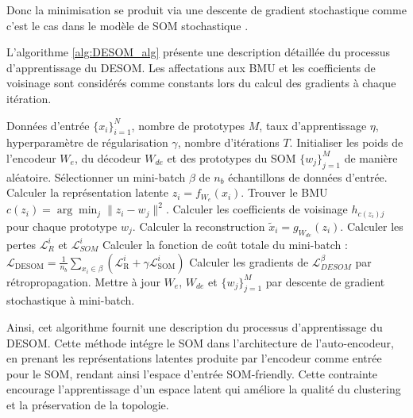 \documentclass[12pt,a4paper]{report}
\begin{document}
Donc la minimisation se produit via une descente de gradient stochastique comme c'est le cas dans le modèle de SOM stochastique \cite{DESOM}.

L'algorithme \ref{alg:DESOM_alg} présente une description détaillée du processus d'apprentissage du DESOM.
Les affectations aux BMU et les coefficients de voisinage sont considérés comme constants lors du calcul des gradients à chaque itération.
\begin{algorithm}[H]
\caption{Algorithme d'apprentissage du DESOM}
\label{alg:DESOM_alg}
\begin{algorithmic}[1]
\Require Données d'entrée $\{x_i\}_{i=1}^N$,
            nombre de prototypes $M$,
            taux d'apprentissage $\eta$,
            hyperparamètre de régularisation $\gamma$,
            nombre d'itérations $T$.
\State Initialiser les poids de l'encodeur $W_e$, du décodeur $W_{de}$ et des prototypes du SOM $\{w_j\}_{j=1}^M$ de manière aléatoire.
    \State Sélectionner un mini-batch $\beta$ de $n_b$ échantillons de données d'entrée.
        \State Calculer la représentation latente $z_i = f_{W_e}(x_i)$.
        \State Trouver le BMU $c(z_i) = \arg\min_j \|z_i - w_j\|^2$.
        \State Calculer les coefficients de voisinage $h_{c(z_i) j}$ pour chaque prototype $w_j$.
        \State Calculer la reconstruction $\tilde{x}_i = g_{W_{de}}(z_i)$.
        \State Calculer les pertes $\mathcal{L}_{R}^{i}$ et $\mathcal{L}_{SOM}^{i}$
    \EndFor
    \State Calculer la fonction de coût totale du mini-batch :
    \State $\mathcal{L}_{\text{DESOM}} = \frac{1}{n_b} \sum_{x_i \in \beta} (\mathcal{L}_{\text{R}}^i + \gamma \mathcal{L}_{\text{SOM}}^i)$
    \State Calculer les gradients de $\mathcal{L}_{DESOM}^{\beta}$ par rétropropagation.
    \State Mettre à jour $W_e$, $W_{de}$ et $\{w_j\}_{j=1}^{M}$ par descente de gradient stochastique à mini-batch.
\EndFor
\end{algorithmic}
\end{algorithm}


Ainsi, cet algorithme fournit une description du processus d'apprentissage du DESOM. Cette méthode intégre le SOM dans l'architecture de l'auto-encodeur, 
en prenant les représentations latentes produite par l'encodeur comme entrée pour le SOM, rendant ainsi l'espace d'entrée SOM-friendly. 
Cette contrainte encourage l'apprentissage d'un espace latent qui améliore la qualité du clustering et la préservation de la topologie.

\end{document}
